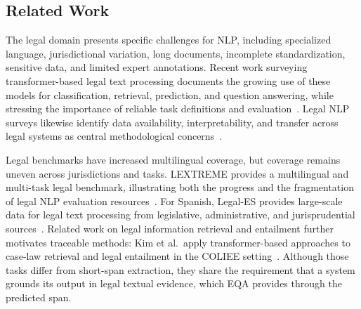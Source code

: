 \documentclass[graybox]{SNmult}
\begin{document}
\subsection{Related Work}


The legal domain presents specific challenges for NLP, including specialized
language, jurisdictional variation, long documents, incomplete standardization,
sensitive data, and limited expert annotations. Recent work surveying
transformer-based legal text processing documents the growing use of these
models for classification, retrieval, prediction, and question answering,
while stressing the importance of reliable task definitions and
evaluation~\cite{greco2024transformerlegal}. Legal NLP surveys likewise identify
data availability, interpretability, and transfer across legal systems as
central methodological concerns~\cite{niklaus2021legalnlp}.

Legal benchmarks have increased multilingual coverage, but coverage remains
uneven across jurisdictions and tasks. LEXTREME provides a multilingual and
multi-task legal benchmark, illustrating both the progress and the
fragmentation of legal NLP evaluation resources~\cite{niklaus2023lextreme}.
For Spanish, Legal-ES provides large-scale data for legal text processing from
legislative, administrative, and jurisprudential sources~\cite{gonzalez2020legales}.
Related work on legal information retrieval and entailment further motivates
traceable methods: Kim et al.\ apply transformer-based approaches to case-law
retrieval and legal entailment in the COLIEE setting~\cite{kim2024legalir}.
Although those tasks differ from short-span extraction, they share the
requirement that a system grounds its output in legal textual evidence, which
EQA provides through the predicted span.

\end{document}
